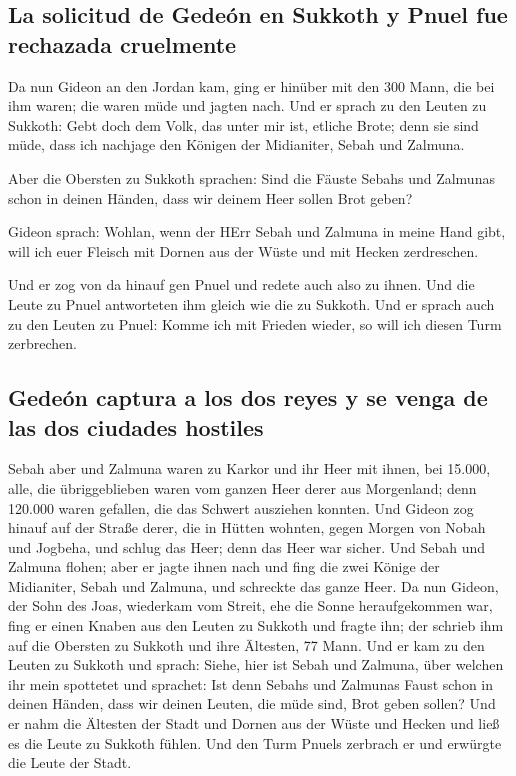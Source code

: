 \hypertarget{la-solicitud-de-gedeuxf3n-en-sukkoth-y-pnuel-fue-rechazada-cruelmente}{%
\subsection{La solicitud de Gedeón en Sukkoth y Pnuel fue rechazada
cruelmente}\label{la-solicitud-de-gedeuxf3n-en-sukkoth-y-pnuel-fue-rechazada-cruelmente}}

 Da nun Gideon an den Jordan kam, ging er hinüber mit den
300 Mann, die bei ihm waren; die waren müde und jagten nach.
 Und er sprach zu den Leuten zu Sukkoth: Gebt doch dem
Volk, das unter mir ist, etliche Brote; denn sie sind müde, dass ich
nachjage den Königen der Midianiter, Sebah und Zalmuna.

 Aber die Obersten zu Sukkoth sprachen: Sind die Fäuste
Sebahs und Zalmunas schon in deinen Händen, dass wir deinem Heer sollen
Brot geben?

 Gideon sprach: Wohlan, wenn der HErr Sebah und Zalmuna in
meine Hand gibt, will ich euer Fleisch mit Dornen aus der Wüste und mit
Hecken zerdreschen.

 Und er zog von da hinauf gen Pnuel und redete auch also
zu ihnen. Und die Leute zu Pnuel antworteten ihm gleich wie die zu
Sukkoth.  Und er sprach auch zu den Leuten zu Pnuel: Komme
ich mit Frieden wieder, so will ich diesen Turm zerbrechen.

\hypertarget{gedeuxf3n-captura-a-los-dos-reyes-y-se-venga-de-las-dos-ciudades-hostiles}{%
\subsection{Gedeón captura a los dos reyes y se venga de las dos
ciudades
hostiles}\label{gedeuxf3n-captura-a-los-dos-reyes-y-se-venga-de-las-dos-ciudades-hostiles}}

 Sebah aber und Zalmuna waren zu Karkor und ihr Heer mit
ihnen, bei 15.000, alle, die übriggeblieben waren vom ganzen Heer derer
aus Morgenland; denn 120.000 waren gefallen, die das Schwert ausziehen
konnten.  Und Gideon zog hinauf auf der Straße derer, die
in Hütten wohnten, gegen Morgen von Nobah und Jogbeha, und schlug das
Heer; denn das Heer war sicher.  Und Sebah und Zalmuna
flohen; aber er jagte ihnen nach und fing die zwei Könige der
Midianiter, Sebah und Zalmuna, und schreckte das ganze Heer.
 Da nun Gideon, der Sohn des Joas, wiederkam vom Streit,
ehe die Sonne heraufgekommen war,  fing er einen Knaben
aus den Leuten zu Sukkoth und fragte ihn; der schrieb ihm auf die
Obersten zu Sukkoth und ihre Ältesten, 77 Mann.  Und er
kam zu den Leuten zu Sukkoth und sprach: Siehe, hier ist Sebah und
Zalmuna, über welchen ihr mein spottetet und sprachet: Ist denn Sebahs
und Zalmunas Faust schon in deinen Händen, dass wir deinen Leuten, die
müde sind, Brot geben sollen?  Und er nahm die Ältesten
der Stadt und Dornen aus der Wüste und Hecken und ließ es die Leute zu
Sukkoth fühlen.  Und den Turm Pnuels zerbrach er und
erwürgte die Leute der Stadt.

